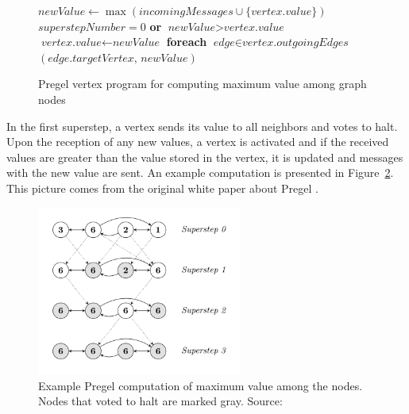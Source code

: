 \begin{figure}[!htbp]

\begin{codebox}
  \li $\textit{newValue} \leftarrow \max (\textit{incomingMessages} \cup \{\textit{vertex.value}\})$
  \li \If  $superstepNumber = 0$ \textbf{or} $\textit{newValue} > \textit{vertex.value}$
  \li \Then
   $\textit{vertex.value} \leftarrow \textit{newValue}$
   \li \textbf{foreach} $\textit{edge} \in \textit{vertex.outgoingEdges}$ \Then
  \li {}$(\textit{edge.targetVertex, newValue})$
  	  \End
  \li \Else
  \li {}
      \End
\end{codebox}
\caption{Pregel vertex program for computing maximum value among graph nodes}\label{psc:pregelmaxval}
\end{figure}

In the first superstep, a vertex sends its value to all neighbors and votes to halt. Upon the reception of any new values, a vertex is activated and if the received values are greater than the value stored in the vertex, it is updated and messages with the new value are sent. An example computation is presented in Figure~\ref{img:pregelmaxval}. This picture comes from the original white paper about Pregel \cite{pregel}.

\begin{figure}[!ht]
\begin{center}
\includegraphics[width=0.6\textwidth]{PregelMaxVal.png}
\caption{Example Pregel computation of maximum value among the nodes. Nodes that voted to halt are marked gray. Source: \cite{pregel}}\label{img:pregelmaxval}
\end{center}
\end{figure}

